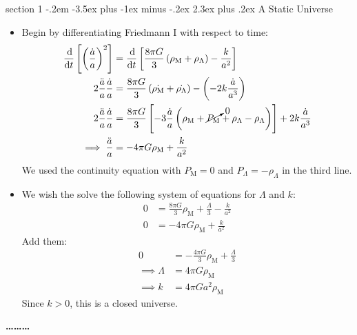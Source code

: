 \documentclass[12pt]{article}
\makeatletter
\newenvironment{problem}{\@startsection
	{section}
	{1}
	{-.2em}
	{-3.5ex plus -1ex minus -.2ex}
	{2.3ex plus .2ex}
	{\pagebreak[3]%
		\large\bf\noindent{Problem }
	}
}
{%
	\begin{center}\large\bf \ldots\ldots\ldots\end{center}}
\makeatother
\begin{document}
	\begin{problem}{A Static Universe}
		\begin{itemize}
			\item Begin by differentiating Friedmann I with respect to time: \begin{align*}
				\frac{\dif}{\dif t} \left[\left(\frac{\dot{a}}{a}\right)^2\right] &= \frac{\dif}{\dif t}  \left[\frac{8\pi G}{3}\left(\rho_\mathrm{M} + \rho_\Lambda\right) - \frac{k}{a^2}\right]
				\\
				2 \frac{\ddot{a}}{a} \frac{\dot{a}}{a} &= \frac{8\pi G}{3}\left(\dot{\rho_\mathrm{M}} + \dot{\rho_\Lambda}\right) - \left(-2k\frac{\dot{a}}{a^3}\right)
				\\
				2 \frac{\ddot{a}}{a} \frac{\dot{a}}{a} &= \frac{8\pi G}{3} \left[-3\frac{\dot{a}}{a}\left(\rho_\mathrm{M} + \cancelto{0}{P_\mathrm{M}} + \rho_\Lambda - \rho_\Lambda \right) \right]+ 2k\frac{\dot{a}}{a^3}
				\\
				\implies \frac{\ddot{a}}{a}&= -4\pi G\rho_\mathrm{M} + \frac{k}{a^2}
			\end{align*} We used the continuity equation with $P_\mathrm{M}=0$ and $P_\Lambda = -\rho_\Lambda$ in the third line.
			
			\item We wish the solve the following system of equations for $\Lambda$ and $k$: \begin{align*}
				0 &= \frac{8\pi G}{3}\rho_\mathrm{M} + \frac{\Lambda}{3} - \frac{k}{a^2}
				\\
				0 &= -4\pi G\rho_\mathrm{M} + \frac{k}{a^2}
			\end{align*} Add them: \begin{align*}
				0 &= -\frac{4\pi G}{3}\rho_\mathrm{M} + \frac{\Lambda}{3}
				\\
				\implies \Lambda &= 4\pi G \rho_\mathrm{M}
				\\
				\implies k &= 4\pi Ga^2\rho_\mathrm{M}
			\end{align*} Since $k>0$, this is a closed universe.
		\end{itemize}
		
	\end{problem}

% 
\end{document}
